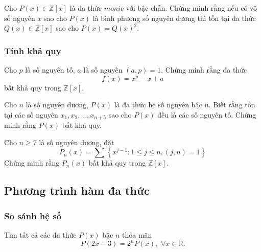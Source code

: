 \begin{bt}
Cho $P(x) \in \mathbb{Z}[x]$ là đa thức $monic$ với bậc chẵn. Chứng minh rằng nếu có vô số nguyên $x$ sao cho $P(x)$ là bình phương số nguyên dương thì tồn tại đa thức $Q(x) \in \mathbb{Z}[x]$ sao cho $P(x)=Q(x)^2$. 
\end{bt}
\subsubsection{Tính khả quy}
\begin{bt}
Cho $p$ là số nguyên tố, $a$ là số nguyên $(a,p)=1$. Chứng minh rằng đa thức 
$$f(x)=x^p-x+a$$
bất khả quy trong $\mathbb{Z}[x]$.
\end{bt}



\begin{bt}
Cho $n$ là số nguyên dương, $P(x)$ là đa thức hệ số nguyên bậc $n$. Biết rằng tồn tại các số nguyên $x_1,x_2,\ldots,x_{n+5}$ sao cho $P(x)$ đều là các số nguyên tố. Chứng minh rằng $P(x)$ bất khả quy.	
\end{bt}

\begin{bt}
Cho $n \geq 7$ là số nguyên dương, đặt 
	$$P_n(x)=\sum \left\{ x^{j - 1}:1 \le j \le n,(j,n) = 1\right\}$$	
	Chứng minh rằng $P_n(x)$ bất khả quy trong $\mathbb{Z}[x]$.
\end{bt}

\subsection{Phương trình hàm đa thức}
\subsubsection{So sánh hệ số}
\begin{bt}
Tìm tất cả các đa thức $P(x)$ bậc $n$ thỏa mãn 
$$P(2x-3)=2^nP(x), \,\, \forall x \in \mathbb{R}.$$
\end{bt}


